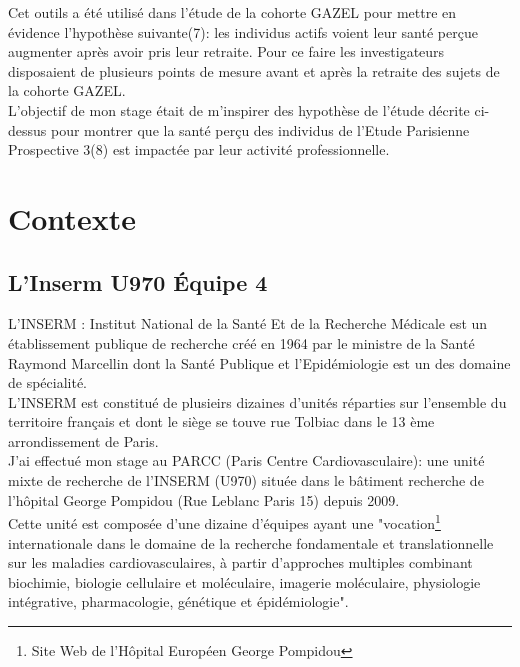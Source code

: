 \documentclass{book}
\begin{document}
Cet outils a été utilisé dans l'étude de la cohorte GAZEL pour mettre en évidence l'hypothèse suivante(7): les individus actifs voient leur santé perçue augmenter après avoir pris leur retraite. Pour ce faire les investigateurs disposaient de plusieurs points de mesure avant et après la retraite des sujets de la cohorte GAZEL.\\

L'objectif de mon stage était de m'inspirer des hypothèse de l'étude décrite ci-dessus pour montrer que la santé perçu des individus de l'Etude Parisienne Prospective 3(8) est impactée par leur activité professionnelle.\\



\newpage
\section{Contexte}
\subsection{L'Inserm U970 Équipe 4}
\noindent
L'INSERM : Institut National de la Santé Et de la Recherche Médicale est un établissement publique de recherche créé en 1964 par le ministre de la Santé Raymond Marcellin dont la Santé Publique et l'Epidémiologie est un des domaine de spécialité.\\
L'INSERM est constitué de plusieirs dizaines d'unités réparties sur l'ensemble du territoire français et dont le siège se touve rue Tolbiac dans le 13 ème arrondissement de Paris.\\
J'ai effectué mon stage au PARCC (Paris Centre Cardiovasculaire): une unité mixte de recherche de l'INSERM (U970) située dans le bâtiment recherche de l'hôpital George Pompidou (Rue Leblanc Paris 15) depuis 2009.\\
Cette unité est composée d'une dizaine d'équipes ayant une "vocation\footnote{Site Web de l'Hôpital Européen George Pompidou} internationale dans le domaine de la recherche fondamentale et translationnelle sur les maladies cardiovasculaires, à partir d'approches multiples combinant biochimie, biologie cellulaire et moléculaire, imagerie moléculaire, physiologie intégrative, pharmacologie, génétique et épidémiologie".\\
\end{document}
